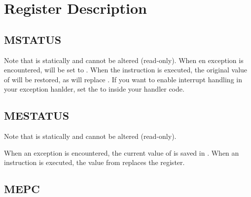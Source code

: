 \section{Register Description}

\subsection{MSTATUS}

Note that  is statically  and cannot be altered (read-only).
When en exception is encountered,  will be set to
. When the  instruction is executed, the original
value of  will be restored, as  will
replace .
If you want to enable interrupt handling in your exception hanlder, set the
 to  inside your handler code.

\subsection{MESTATUS}

Note that  is statically  and cannot be altered (read-only).

When an exception is encountered, the current value of  is saved
in . When an  instruction is executed, the value
from  replaces the  register.


\subsection{MEPC}

